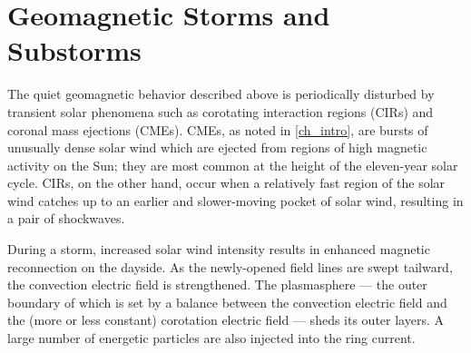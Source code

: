 


\section{Geomagnetic Storms and Substorms}
  \label{sec_storms}

The quiet geomagnetic behavior described above is periodically disturbed by transient solar phenomena such as corotating interaction regions (CIRs) and coronal mass ejections (CMEs). CMEs, as noted in \cref{ch_intro}, are bursts of unusually dense solar wind which are ejected from regions of high magnetic activity on the Sun; they are most common at the height of the eleven-year solar cycle. CIRs, on the other hand, occur when a relatively fast region of the solar wind catches up to an earlier and slower-moving pocket of solar wind, resulting in a pair of shockwaves. 

During a storm, increased solar wind intensity results in enhanced magnetic reconnection on the dayside. As the newly-opened field lines are swept tailward, the convection electric field is strengthened. The plasmasphere --- the outer boundary of which is set by a balance between the convection electric field and the (more or less constant) corotation electric field --- sheds its outer layers. A large number of energetic particles are also injected into the ring current\cite{mcpherron_1997}. 

